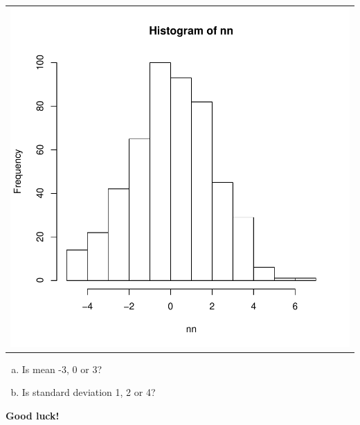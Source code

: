\documentclass{article}
\begin{document}
\begin{itemize}
\begin{tabular}{c}
{\includegraphics{exam1-002}
}
\end{tabular}

\begin{enumerate}[(a)]
\item Is mean -3, 0 or 3? 
\vspace{\baselineskip}\item Is standard deviation 1, 2 or 4? 
\vspace{\baselineskip}\end{enumerate}
\end{itemize}
{\bf Good luck! }\newpage
\end{document}
